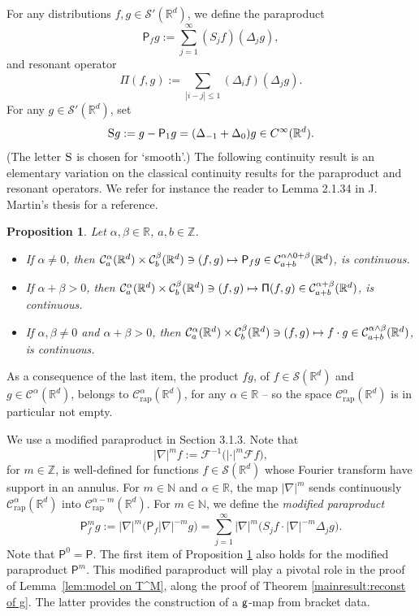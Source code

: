 \documentclass[10pt]{amsart}
\newcommand\mto{\mathchoice{\longmapsto}{\mapsto}{\mapsto}{\mapsto}}
\theoremstyle{plain}
\newtheorem{prop}[thm]{Proposition}
\theoremstyle{definition}
\newcommand{\rap}{\mathrm{rap}}
\newcommand{\sfP}{\mathsf{P}}
\newcommand{\sfPi}{\mathsf{\Pi}}
\newcommand{\bbN}{\mathbb{N}}
\newcommand{\bbR}{\mathbb{R}}
\newcommand{\mcC}{\mathcal{C}}
\newcommand{\mcF}{\mathcal{F}}
\newcommand\mcS{\mathcal{S}}
\begin{document}
For any distributions $f,g\in\mcS'(\bbR^d)$, we define the paraproduct\vspace*{-3pt}
\[
\sfP_fg:=\sum_{j=1}^\infty (S_jf) (\Delta_jg),
\]
and resonant operator\vspace*{-3pt}
\[
\sfPi(f,g):=\sum_{|i-j|\le1}(\Delta_if)(\Delta_jg).
\]
For any $g\in\mcS'(\bbR^d)$, set
\begin{equation} \label{EqDefnSmoothS}
\textsc{S} g := g - \sfP_1g = (\Delta_{-1} + \Delta_0)g \in C^\infty(\bbR^d).
\end{equation}
(The letter $\textsc{S}$ is chosen for `smooth'.) The following continuity result is an elementary variation on the classical continuity results for the paraproduct and resonant operators. We refer for instance the reader to Lemma 2.1.34 in J. Martin's thesis \cite{MartinThesis} for a reference.

\begin{prop}\label{prop:continuity of the paraproduct}
Let $\alpha,\beta\in\bbR$, $a,b\in\mathbb{Z}$.
\begin{itemize}
\item If $\alpha\neq0$, then $\mcC_a^\alpha(\bbR^d)\times \mcC_b^\beta(\bbR^d)\ni(f,g)\mto\sfP_fg\in \mcC_{a+b}^{\alpha\wedge0+\beta}(\bbR^d)$, is continuous.
\item If $\alpha+\beta>0$, then $\mcC_a^\alpha(\bbR^d)\times \mcC_b^\beta(\bbR^d)\ni(f,g)\mto\sfPi(f,g)\in \mcC_{a+b}^{\alpha+\beta}(\bbR^d)$, is continuous.
\item If $\alpha,\beta\neq0$ and $\alpha+\beta>0$, then $\mcC_a^\alpha(\bbR^d)\times \mcC_b^\beta(\bbR^d)\ni(f,g)\mto f\cdot g\in \mcC_{a+b}^{\alpha\wedge\beta}(\bbR^d)$, is continuous.
\end{itemize}
\end{prop}

As a consequence of the last item, the product $fg$, of $f\in\mcS(\bbR^d)$ and $g\in \mcC^\alpha(\bbR^d)$, belongs to $\mcC_\rap^\alpha(\bbR^d)$, for any $\alpha\in\bbR$ -- so the space $\mcC_\rap^\alpha(\bbR^d)$ is in particular not empty.

We use a modified paraproduct in Section 3.1.3. Note that
\[
|\nabla|^m f:=\mcF^{-1}\bigl(|{\cdot}|^m\mcF f\bigr),
\]
for $m\in\mathbb{Z}$, is well-defined for functions $f\in\mcS(\bbR^d)$ whose Fourier transform have support in an annulus. For $m\in\bbN$ and $\alpha\in\bbR$, the map $|\nabla|^m$ sends continuously $\mcC_\rap^\alpha(\bbR^d)$ into $\mcC_\rap^{\alpha-m}(\bbR^d)$. For $m\in\bbN$, we define the \emph{{modified paraproduct}}\vspace*{-3pt}
\[
\sfP_f^m g := |\nabla|^m\bigl(\sfP_f|\nabla|^{-m}g\bigr) = \sum_{j=1}^\infty|\nabla|^m\bigl(S_jf\cdot|\nabla|^{-m}\Delta_jg\bigr).
\]
Note that $\sfP^0=\sfP$. The first item of Proposition \ref{prop:continuity of the paraproduct} also holds for the modified paraproduct $\sfP^m$. This modified paraproduct will play a pivotal role in the proof of Lemma~\ref{lem:model on T^M}, along the proof of Theorem \ref{mainresult:reconst of g}. The latter provides the construction of a $\sf g$-map from bracket data.
\end{document}
